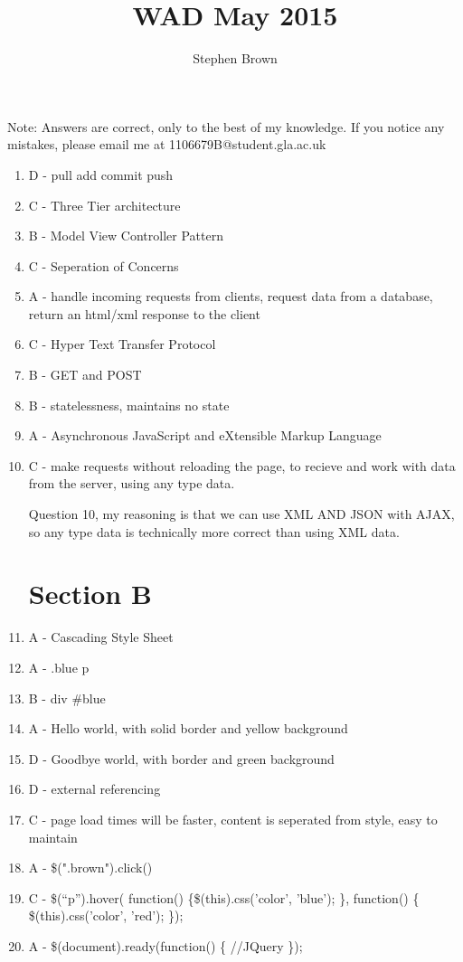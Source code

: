 \documentclass{article}
\title{WAD May 2015}
\author{Stephen Brown}
\begin{document}
\maketitle

Note: Answers are correct, only to the best of my knowledge. If you notice any mistakes, please email me at 1106679B@student.gla.ac.uk

\begin{enumerate}
\section{Section A}
\item{D - pull add commit push}
\item{C - Three Tier architecture}
\item{B - Model View Controller Pattern}
\item{C - Seperation of Concerns}
\item{A - handle incoming requests from clients, request data from a database, return an html/xml response to the client}
\item{C - Hyper Text Transfer Protocol}
\item{B - GET and POST}
\item{B - statelessness, maintains no state}
\item{A - Asynchronous JavaScript and eXtensible Markup Language}
\item{C - make requests without reloading the page, to recieve and work with data from the server, using any type data.}

Question 10, my reasoning is that we can use XML AND JSON with AJAX, so any type data is technically more correct than using XML data.

\section{Section B}
\item A - Cascading Style Sheet
\item A - .blue p
\item B - div \#blue
\item A - Hello world, with solid border and yellow background
\item D - Goodbye world, with border and green background
\item D - external referencing
\item C - page load times will be faster, content is seperated from style, easy to maintain
\item A - \$(".brown").click()
\item C - \$(``p'').hover( function() \{\$(this).css('color', 'blue'); \}, function() \{ \$(this).css('color', 'red'); \});
\item A - \$(document).ready(function() \{ //JQuery \});


\end{enumerate}
\end{document}
